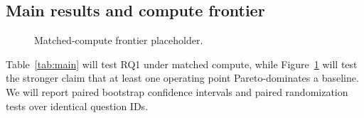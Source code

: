 \subsection{Main results and compute frontier}

\begin{table}[t]
\caption{Frozen multi-hop QA results under matched compute. Values are intentionally blank until the final protocol is executed. Best results should be bolded only after significance testing.}
\label{tab:main}
\centering
{}
\end{table}

\begin{figure}[t]
\centering
{}
\caption{Matched-compute frontier placeholder.}
\label{fig:pareto}
\end{figure}

Table~\ref{tab:main} will test RQ1 under matched compute, while Figure~\ref{fig:pareto} will test the stronger claim that at least one \method{} operating point Pareto-dominates a baseline. We will report paired bootstrap confidence intervals and paired randomization tests over identical question IDs. 


